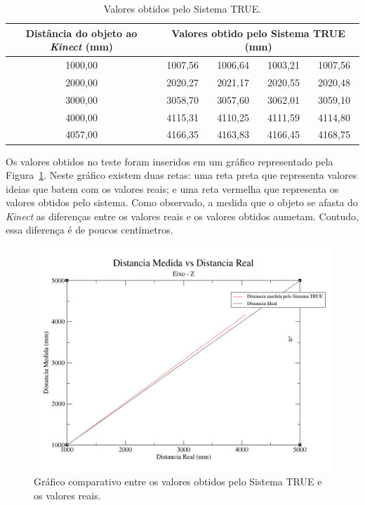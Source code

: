 		\begin{table}[h]
		\begin{center}
			\caption{Valores obtidos pelo Sistema TRUE.}
			\begin{tabular}{|c|c|c|c|c|}
				\hline \bf Distância do objeto ao \textit{Kinect} (mm) & \multicolumn{4}{|c|}{\bf Valores obtido pelo Sistema TRUE (mm)} \\
				\hline
				\hline 1000,00 & 1007,56 & 1006,64 & 1003,21 & 1007,56 \\
				\hline 2000,00 & 2020,27 & 2021,17 & 2020,55 & 2020,48 \\
				\hline 3000,00 & 3058,70 & 3057,60 & 3062,01 & 3059,10 \\
				\hline 4000,00 & 4115,31 & 4110,25 & 4111,59 & 4114,80 \\
				\hline 4057,00 & 4166,35 & 4163,83 & 4166,45 & 4168,75 \\
				\hline
			\end{tabular}
		\end{center}
		\label{tab:valores-z}
	\end{table}

	Os valores obtidos no teste foram inseridos em um gráfico representado pela Figura~\ref{fig:grafico-z}. Neste gráfico existem duas retas: uma reta preta que representa valores ideias que batem com os valores reais; e uma reta vermelha que representa os valores obtidos pelo sistema. Como observado, a medida que o objeto se afasta do \textit{Kinect} as diferenças entre os valores reais e os valores obtidos aumetam. Contudo, essa diferença é de poucos centímetros.

	\begin{figure}[htb]
		\begin{center}
			\includegraphics[scale=0.4]{figuras/5.Testes/grafico-eixo-z.png}
		\end{center}
		\caption{Gráfico comparativo entre os valores obtidos pelo Sistema TRUE e os valores reais.}
		\label{fig:grafico-z}
	\end{figure}


